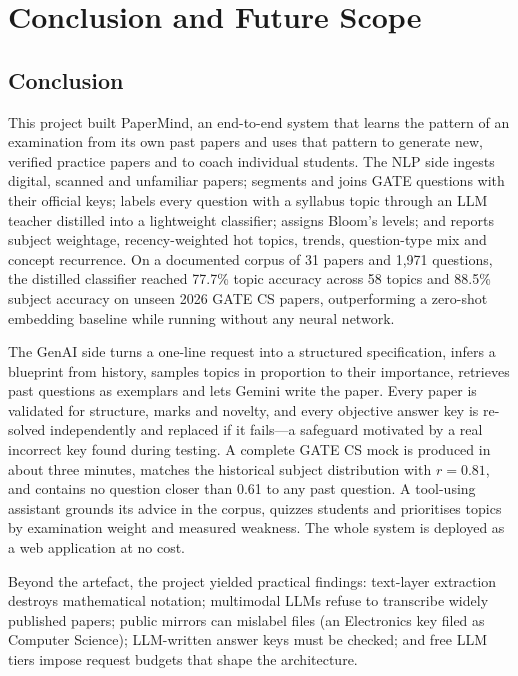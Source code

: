 \chapter{Conclusion and Future Scope}\label{ch:conc}

\section{Conclusion}
This project built PaperMind, an end-to-end system that learns the pattern of an examination from its own past papers and
uses that pattern to generate new, verified practice papers and to coach individual students. The NLP side ingests
digital, scanned and unfamiliar papers; segments and joins GATE questions with their official keys; labels every
question with a syllabus topic through an LLM teacher distilled into a lightweight classifier; assigns Bloom's levels;
and reports subject weightage, recency-weighted hot topics, trends, question-type mix and concept recurrence. On a
documented corpus of 31 papers and 1,971 questions, the distilled classifier reached 77.7\% topic accuracy across 58
topics and 88.5\% subject accuracy on unseen 2026 GATE CS papers, outperforming a zero-shot embedding baseline while
running without any neural network.

The GenAI side turns a one-line request into a structured specification, infers a blueprint from history, samples
topics in proportion to their importance, retrieves past questions as exemplars and lets Gemini write the paper. Every
paper is validated for structure, marks and novelty, and every objective answer key is re-solved independently and
replaced if it fails---a safeguard motivated by a real incorrect key found during testing. A complete GATE CS mock is
produced in about three minutes, matches the historical subject distribution with $r=0.81$, and contains no question
closer than 0.61 to any past question. A tool-using assistant grounds its advice in the corpus, quizzes students and
prioritises topics by examination weight and measured weakness. The whole system is deployed as a web application at no
cost.

Beyond the artefact, the project yielded practical findings: text-layer extraction destroys mathematical notation;
multimodal LLMs refuse to transcribe widely published papers; public mirrors can mislabel files (an Electronics key filed
as Computer Science); LLM-written answer keys must be checked; and free LLM tiers impose request budgets that shape the
architecture.

